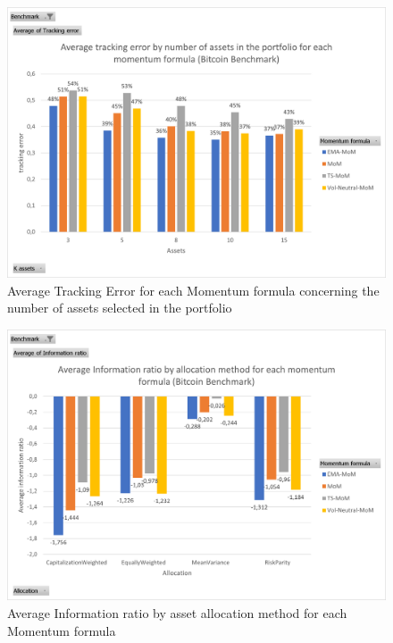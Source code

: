 \documentclass{article}
\begin{document}
\begin{figure}[H] %
    \centering
    \includegraphics[width=0.75\linewidth]{relative_management/btc_bench_TE_by_k_assets_for_formula.png}
    \caption{Average Tracking Error for each Momentum formula concerning the number of assets selected in the portfolio}
    \label{fig:TEForAllMoM}
\end{figure}
\begin{figure}[H] %
    \centering
    \includegraphics[width=0.75\linewidth]{relative_management/IR_by_aloc_for_all_mom.png}
    \caption{Average Information ratio by asset allocation method for each Momentum formula}
    \label{fig:IR_by_aloc_for_all_mom}
\end{figure}
\end{document}
